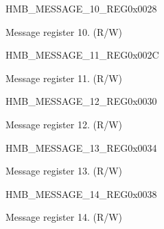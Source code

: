 \begin{register}{H}{MB\_MESSAGE\_10\_REG}{0x0028}\label{regdesc:MBMESSAGE10REG}
%
\regnewline%
\begin{regdesc}\begin{reglist}
\label{fielddesc:MBMESSAGE10}\item [MB\_MESSAGE\_10] Message register 10. (R/W)
\end{reglist}\end{regdesc}
\end{register}


\begin{register}{H}{MB\_MESSAGE\_11\_REG}{0x002C}\label{regdesc:MBMESSAGE11REG}
%
\regnewline%
\begin{regdesc}\begin{reglist}
\label{fielddesc:MBMESSAGE11}\item [MB\_MESSAGE\_11] Message register 11. (R/W)
\end{reglist}\end{regdesc}
\end{register}


\begin{register}{H}{MB\_MESSAGE\_12\_REG}{0x0030}\label{regdesc:MBMESSAGE12REG}
%
\regnewline%
\begin{regdesc}\begin{reglist}
\label{fielddesc:MBMESSAGE12}\item [MB\_MESSAGE\_12] Message register 12. (R/W)
\end{reglist}\end{regdesc}
\end{register}


\begin{register}{H}{MB\_MESSAGE\_13\_REG}{0x0034}\label{regdesc:MBMESSAGE13REG}
%
\regnewline%
\begin{regdesc}\begin{reglist}
\label{fielddesc:MBMESSAGE13}\item [MB\_MESSAGE\_13] Message register 13. (R/W)
\end{reglist}\end{regdesc}
\end{register}


\begin{register}{H}{MB\_MESSAGE\_14\_REG}{0x0038}\label{regdesc:MBMESSAGE14REG}
%
\regnewline%
\begin{regdesc}\begin{reglist}
\label{fielddesc:MBMESSAGE14}\item [MB\_MESSAGE\_14] Message register 14. (R/W)
\end{reglist}\end{regdesc}
\end{register}


